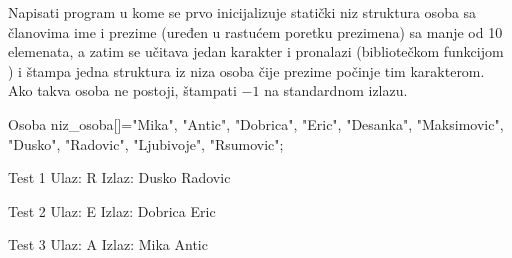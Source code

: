 \begin{Exercise}[label=411]
  Napisati program u kome se prvo inicijalizuje statički niz struktura
  osoba sa članovima ime i prezime (uređen u rastućem poretku
  prezimena) sa manje od 10 elemenata, a zatim se učitava jedan
  karakter i pronalazi (bibliotečkom funkcijom ) i
  štampa jedna struktura iz niza osoba čije prezime počinje tim
  karakterom. Ako takva osoba ne postoji, štampati $-1$ na standardnom
  izlazu.
\begin{ckod}
Osoba niz_osoba[]={{"Mika", "Antic"},
                   {"Dobrica", "Eric"},
                   {"Desanka", "Maksimovic"},
                   {"Dusko", "Radovic"},
                   {"Ljubivoje", "Rsumovic"}};
\end{ckod}
  
\begin{minitest}
\begin{test}{Test 1}
Ulaz:
  R
Izlaz:
  Dusko Radovic
\end{test}
\end{minitest}
\begin{minitest}
\begin{test}{Test 2}
Ulaz:
  E
Izlaz:
  Dobrica Eric
\end{test}
\end{minitest}
\begin{minitest}
\begin{test}{Test 3}
Ulaz:
  A
Izlaz:
  Mika Antic
\end{test}
\end{minitest}


\end{Exercise}





